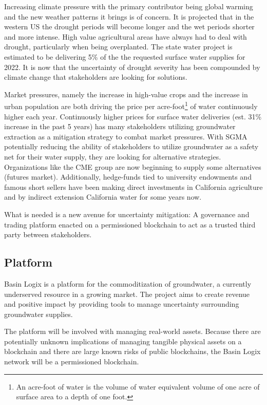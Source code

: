 \documentclass{tufte-handout}
\begin{document}
Increasing climate pressure with the primary contributor being global warming and the new weather patterns it brings is of concern. It is projected that in the western US the drought periods will become longer and the wet periods shorter and more intense\cite{Diffenbaugh2020}. High value agricultural areas have always had to deal with drought, particularly when being overplanted. The state water project is estimated to be delivering 5\% of the the requested surface water supplies for 2022\cite{statewater}. It is now that the uncertainty of drought severity has been compounded by climate change that stakeholders are looking for solutions.

Market pressures, namely the increase in high-value crops and the increase in urban population are both driving the price per acre-foot\footnote{An acre-foot of water is the volume of water equivalent volume of one acre of surface area to a depth of one foot.} of water continuously higher each year. Continuously higher prices for surface water deliveries (est. 31\% increase in the past 5 years)\cite{value} has many stakeholders utilizing groundwater extraction as a mitigation strategy to combat market pressures. With SGMA potentially reducing the ability of stakeholders to utilize groundwater as a safety net for their water supply, they are looking for alternative strategies. Organizations like the CME group are now beginning to supply some alternatives (futures market). Additionally, hedge-funds tied to university endowments\cite{harvard} and famous short sellers\cite{burry} have been making direct investments in California agriculture and by indirect extension California water for some years now.

What is needed is a new avenue for uncertainty mitigation: \break A governance and trading platform enacted on a permissioned blockchain to act as a trusted third party between stakeholders. 

\subsection{Platform}\label{sec:headings}

Basin Logix is a platform for the commoditization of groundwater, a currently underserved resource in a growing market. The project aims to create revenue and positive impact by providing tools to manage uncertainty surrounding groundwater supplies. 

The platform will be involved with managing real-world assets. Because there are potentially unknown implications of managing tangible physical assets on a blockchain and there are large known risks of public blockchains, the Basin Logix network will be a permissioned blockchain.
\end{document}
